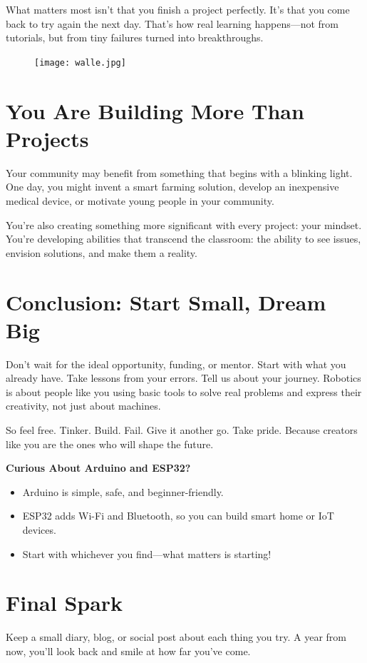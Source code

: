 \documentclass[a4paper,10pt,twocolumn]{memoir}
\begin{document}
What matters most isn’t that you finish a project perfectly. It’s that you come back to try again the next day. That’s how real learning happens—not from tutorials, but from tiny failures turned into breakthroughs.
\begin{figure}[ht]
  \centering
  \texttt{[image: walle.jpg]}
  \caption*{}
  \label{fig2}
\end{figure}
\section*{You Are Building More Than Projects}
Your community may benefit from something that begins with a blinking light. One day, you might invent a smart farming solution, develop an inexpensive medical device, or motivate young people in your community.

You’re also creating something more significant with every project: your mindset. You’re developing abilities that transcend the classroom: the ability to see issues, envision solutions, and make them a reality.
\section*{Conclusion: Start Small, Dream Big}
Don’t wait for the ideal opportunity, funding, or mentor. Start with what you already have. Take lessons from your errors. Tell us about your journey. Robotics is about people like you using basic tools to solve real problems and express their creativity, not just about machines.

So feel free. Tinker. Build. Fail. Give it another go. Take pride. Because creators like you are the ones who will shape the future.
\begin{center}
\begin{boxedminipage}{0.8\textwidth}
\textbf{Curious About Arduino and ESP32?}
\begin{itemize}
    \item Arduino is simple, safe, and beginner-friendly.
    \item ESP32 adds Wi-Fi and Bluetooth, so you can build smart home or IoT devices.
    \item Start with whichever you find—what matters is starting!
\end{itemize}
\end{boxedminipage}
\end{center}
\section*{Final Spark}
Keep a small diary, blog, or social post about each thing you try. A year from now, you’ll look back and smile at how far you’ve come.
\clearpage
\end{document}
